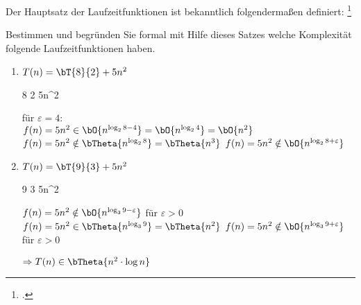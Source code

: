 \documentclass{bschlangaul-aufgabe}
\begin{document}

\let\O=\bO
\let\o=\bOmega
\let\T=\bT
\let\t=\bTheta

Der Hauptsatz der Laufzeitfunktionen ist bekanntlich folgendermaßen
definiert:
\footcite{examen:66115:2019:09}

\bMasterFaelle

\noindent
Bestimmen und begründen Sie formal mit Hilfe dieses Satzes welche
Komplexität folgende Laufzeitfunktionen haben.

\begin{enumerate}


\item $T(n) = \T{8}{2} + 5n^2$

\begin{bAntwort}
\bMasterVariablenDeklaration
{8} %
{2} %
{5n^2} %

\bMasterFallRechnung
{für $\varepsilon = 4$: \\
$f(n) = 5n^2 \in \O{n^{\log_2 {8 - 4}}} = \O{n^{\log_2 4}} = \O{n^2}$}
{$f(n) = 5n^2 \notin \t{n^{\log_2 {8}}} = \t{n^3}$}
{$f(n) = 5n^2 \notin \O{n^{\log_2 {8 + \varepsilon}}}$}

\end{bAntwort}


\item $T(n) = \T{9}{3} + 5n^2$

\begin{bAntwort}
\bMasterVariablenDeklaration
{9} %
{3} %
{5n^2} %

\bMasterFallRechnung
{$f(n) = 5n^2 \notin \O{n^{\log_3 {9 - \varepsilon}}}$ für $\varepsilon > 0$}
{$f(n) = 5n^2 \in \t{n^{\log_3 {9}}} = \t{n^2}$}
{$f(n) = 5n^2 \notin \O{n^{\log_3 {9 + \varepsilon}}}$ für $\varepsilon > 0$}

$\Rightarrow T(n) \in \t{n^2 \cdot \log n}$

\end{bAntwort}

\end{enumerate}
\end{document}
